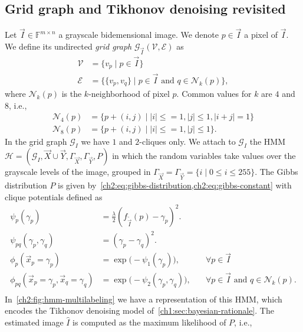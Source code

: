 \subsection{Grid graph and Tikhonov denoising revisited}
Let $\vec{I} \in \mathbb{F}^{m \times n}$ a grayscale bidemensional image. We denote $p \in \vec{I}$ a pixel of $\vec{I}$.  We define its undirected \emph{grid graph} $\mathcal{G}_{\vec{I}}(\mathcal{V},\mathcal{E})$ as
\begin{align*}
	\mathcal{V} &= \{ v_p \; | \; p \in \vec{I} \} \\
	\mathcal{E} &= \big\{ \{v_p,v_q\} \; | \; p \in \vec{I} \text{ and } q \in \mathcal{N}_k(p) \big\},
\end{align*}
%
where $\mathcal{N}_k(p)$ is the $k$-neighborhood of pixel $p$. Common values for $k$ are $4$ and $8$, i.e., 
\begin{align*}
	\mathcal{N}_4(p) &= \{ p + (i,j) \; | \; |i| \leq=1, |j| \leq 1, |i+j|=1 \}\\
	\mathcal{N}_8(p) &= \{ p + (i,j) \; | \; |i| \leq=1, |j| \leq 1 \}.
\end{align*}
%
In the grid graph $\mathcal{G}_I$ we have $1$ and $2$-cliques only. We attach to $\mathcal{G}_I$ the HMM $\mathcal{H} = (\mathcal{G}_I,\vec{X} \cup \vec{Y},\Gamma_{\vec{X}},\Gamma_{\vec{Y}},P)$ in which the random variables take values over the grayscale levels of the image, grouped in $\Gamma_{\vec{X}} = \Gamma_{\vec{Y}} = \{i \; | \; 0 \leq i \leq 255 \}$. The Gibbs distribution $P$ is given by~\cref{ch2:eq:gibbs-distribution,ch2:eq:gibbs-constant} with clique potentials defined as
\begin{equation*}
	\begin{array}{rll}
	\psi_{p}(\gamma_p) &=  \frac{\lambda}{2} \left( f_{\widetilde{\vec{I}}}(p) - \gamma _p \right) ^2. & \\
	\psi_{pq}(\gamma_p, \gamma_q) &= ( \gamma _p - \gamma _q )^2. &\\[1em]
	\phi_p(\vec{x}_p=\gamma _p) &= \exp\big( - \psi_1(\gamma_p) \big),& \quad \forall p \in \vec{I} \\
	\phi_{pq}(\vec{x}_p=\gamma_p, \vec{x}_q=\gamma _q) &= \exp\big( - \psi_{2}(\gamma_p,\gamma_q) \big),& \quad \forall p \in \vec{I} \text{ and }  q \in \mathcal{N}_k(p). \\
	\end{array}
\end{equation*}
%
In~\cref{ch2:fig:hmm-multilabeling} we have a representation of this HMM, which encodes the Tikhonov denoising model of~\cref{ch1:sec:bayesian-rationale}. The estimated image $\widehat{I}$ is computed as the maximum likelihood of $P$, i.e.,
